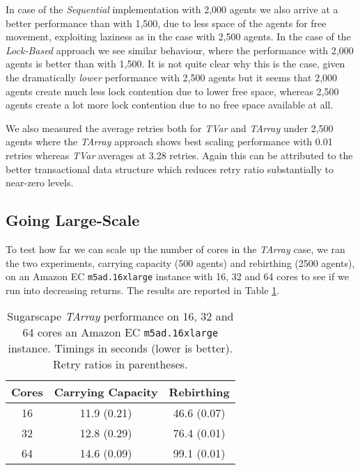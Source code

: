 In case of the \textit{Sequential} implementation with 2,000 agents we also arrive at a better performance than with 1,500, due to less space of the agents for free movement, exploiting laziness as in the case with 2,500 agents. In the case of the \textit{Lock-Based} approach we see similar behaviour, where the performance with 2,000 agents is better than with 1,500. It is not quite clear why this is the case, given the dramatically \textit{lower} performance with 2,500 agents but it seems that 2,000 agents create much less lock contention due to lower free space, whereas 2,500 agents create a lot more lock contention due to no free space available at all.

We also measured the average retries both for \textit{TVar} and \textit{TArray} under 2,500 agents where the \textit{TArray} approach shows best scaling performance with 0.01 retries whereas \textit{TVar} averages at 3.28 retries. Again this can be attributed to the better transactional data structure which reduces retry ratio substantially to near-zero levels.

\subsection{Going Large-Scale}
To test how far we can scale up the number of cores in the \textit{TArray} case, we ran the two experiments, carrying capacity (500 agents) and rebirthing (2500 agents), on an Amazon EC \texttt{m5ad.16xlarge} instance with 16, 32 and 64 cores to see if we run into decreasing returns. The results are reported in Table \ref{tab:sug_varying_cores_amazon}.

\begin{table}
	\centering
  	\begin{tabular}{ c || c | c }
        Cores  & Carrying Capacity  & Rebirthing    \\ \hline \hline 
    	    16     & 11.9 (0.21)        & 46.6 (0.07)   \\ \hline
   		32     & 12.8 (0.29)        & 76.4 (0.01)   \\ \hline
   		64     & 14.6 (0.09)        & 99.1 (0.01)   \\ \hline \hline
   	\end{tabular}

  	\caption{Sugarscape \textit{TArray} performance on 16, 32 and 64 cores an Amazon EC \texttt{m5ad.16xlarge} instance. Timings in seconds (lower is better). Retry ratios in parentheses.}
	\label{tab:sug_varying_cores_amazon}
\end{table}

